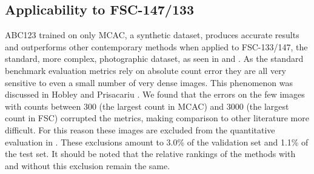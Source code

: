 \documentclass[runningheads]{llncs}
\newcommand{\cmark}{\ding{51}}%
\newcommand{\xmark}{\ding{55}}%
\begin{document}
\begin{table}[t]
    \centering
    \caption{\textbf{Comparison to SOTA methods on MCAC.} We significantly outperform methods which use exemplar images and test-time adaptation without requiring them. ABC123\textsmaller[2]{\SnowflakeChevron} denotes our method trained with a frozen pre-trained backbone.
    }
    \fontsize{9}{9}\selectfont
        
    \label{blender_results_table}
\end{table}

\begin{table}[t]
    \centering
    \caption{\textbf{Comparison to SOTA methods on MCAC-M1.} MCAC-M1 is the subset of MCAC with only one class present per image. Methods are either trained on the full multi-class dataset (\cmark) or MCAC-M1 (\xmark). `$\hat{m}$' denotes the number of predictions the method generates per query and `Shots' denotes the number of exemplar images per query at inference time. CounTR\dag \ is an exemplar-free adaption of CounTR as in Hobley and Prisacariu \cite{hobley2023LTCA}.  ABC123 outperforms other methods when trained in single or multi-class settings.
    }
    \resizebox{\linewidth}{!}{%
    
    }
    \label{blender_single_class_results}
\end{table}
\subsection{Applicability to FSC-147/133}\label{sec:results_fsc}
ABC123 trained on only MCAC, a synthetic dataset, produces accurate results and outperforms other contemporary methods when applied to FSC-133/147, the standard, more complex, photographic dataset,  as seen in  and . 
As the standard benchmark evaluation metrics rely on absolute count error they are all very sensitive to even a small number of very dense images.
This phenomenon was discussed in Hobley and Prisacariu \cite{hobley2023LTCA}. 
We found that the errors on the few images with counts between 300 (the largest count in MCAC) and 3000 (the largest count in FSC) corrupted the metrics, making comparison to other literature more difficult. 
For this reason these images are excluded from the quantitative evaluation in . These exclusions amount to 3.0\% of the validation set and 1.1\% of the test set. It should be noted that the relative rankings of the methods with and without this exclusion remain the same. 
\end{document}

